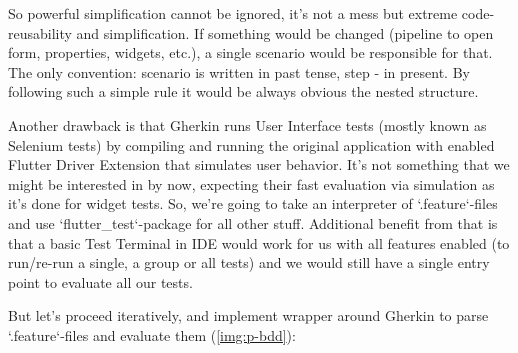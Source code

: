 So powerful simplification cannot be ignored, it's not a mess but extreme code-reusability and simplification. If
something would be changed (pipeline to open form, properties, widgets, etc.), a single scenario would be responsible 
for that. The only convention: scenario is written in past tense, step - in present. By following such a simple rule it 
would be always obvious the nested structure. 

Another drawback is that Gherkin runs User Interface tests (mostly known as Selenium tests) by compiling and running 
the original application with enabled Flutter Driver Extension that simulates user behavior. It's not something that we 
might be interested in by now, expecting their fast evaluation via simulation as it's done for widget tests. So, we're 
going to take an interpreter of `.feature`-files and use `flutter\_test`-package for all other stuff. Additional benefit
from that is that a basic Test Terminal in IDE would work for us with all features enabled (to run/re-run a single, a 
group or all tests) and we would still have a single entry point to evaluate all our tests.

But let's proceed iteratively, and implement wrapper around Gherkin to parse `.feature`-files and evaluate 
them (\cref{img:p-bdd}):

